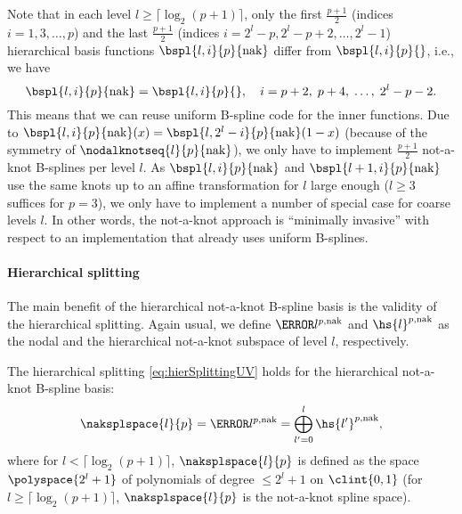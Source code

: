 Note that in each level $l \ge \lceil\log_2(p+1)\rceil$,
only the first $\tfrac{p+1}{2}$
(indices $i = 1, 3, \dotsc, p$)
and the last $\tfrac{p+1}{2}$
(indices $i = 2^l - p, 2^l - p + 2, \dotsc, 2^l - 1$)
hierarchical basis functions $\bspl{l,i}{p}{\nak}$
differ from $\bspl{l,i}{p}{}$,
i.e., we have
\begin{equation}
  \bspl{l,i}{p}{\nak} = \bspl{l,i}{p}{},\quad
  i = p + 2,\; p + 4,\; \dotsc,\; 2^l - p - 2.
\end{equation}
This means that we can reuse uniform B-spline code
for the inner functions.
Due to $\bspl{l,i}{p}{\nak}(x) = \bspl{l,2^l-i}{p}{\nak}(1-x)$
(because of the symmetry of $\nodalknotseq{l}{p}{\nak}$),
we only have to implement $\tfrac{p+1}{2}$ not-a-knot B-splines per level $l$.
As $\bspl{l,i}{p}{\nak}$ and $\bspl{l+1,i}{p}{\nak}$
use the same knots up to an affine transformation for $l$ large enough
($l \ge 3$ suffices for $p = 3$),
we only have to implement a number of special case for coarse levels $l$.
In other words, the not-a-knot approach is ``minimally invasive''
with respect to an implementation that already uses uniform B-splines.

\paragraph{Hierarchical splitting}

The main benefit of the hierarchical not-a-knot B-spline basis
is the validity of the hierarchical splitting.
Again usual, we define $\ns{l}^{p,\nak}$ and $\hs{l}^{p,\nak}$
as the nodal and the hierarchical not-a-knot subspace of level $l$,
respectively.

\begin{proposition}
  \label{prop:hierSplittingNAKBSplineUV}
  The hierarchical splitting \eqref{eq:hierSplittingUV}
  holds for the hierarchical not-a-knot B-spline basis:
  \begin{equation}
    \naksplspace{l}{p}
    = \ns{l}^{p,\nak}
    = \bigoplus_{l'=0}^l \hs{l'}^{p,\nak},
  \end{equation}
  where for $l < \lceil\log_2(p+1)\rceil$, $\naksplspace{l}{p}$
  is defined as the space $\polyspace{2^l + 1}$ of polynomials of degree
  $\le 2^l + 1$ on $\clint{0, 1}$
  (for $l \ge \lceil\log_2(p+1)\rceil$,
  $\naksplspace{l}{p}$ is the not-a-knot spline space).
\end{proposition}


